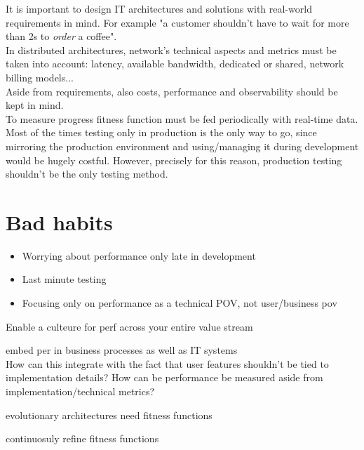 It is important to design IT architectures and solutions with real-world requirements in mind.
For example "a customer shouldn't have to wait for more than 2s to \textit{order} a coffee".\\
In distributed architectures, network's technical aspects and metrics must be taken into account: latency, available bandwidth, dedicated or shared, network billing models...\\
Aside from requirements, also costs, performance and observability should be kept in mind.\\
To measure progress fitness function must be fed periodically with real-time data.
\nl
Most of the times testing only in production is the only way to go,
since mirroring the production environment and using/managing it during development would be hugely costful.
However, precisely for this reason, production testing shouldn't be the only testing method.

\section{Bad habits}
\begin{itemize}
    \item Worrying about performance only late in development
    \item Last minute testing
    \item Focusing only on performance as a technical POV,
    not user/business pov
\end{itemize}

Enable a culteure for perf across your entire value stream

embed per in business processes as well as IT systems\\
How can this integrate with the fact that user features shouldn't be tied to implementation details? How can be performance be measured aside from implementation/technical metrics?

evolutionary architectures need fitness functions

continuosuly refine fitness functions